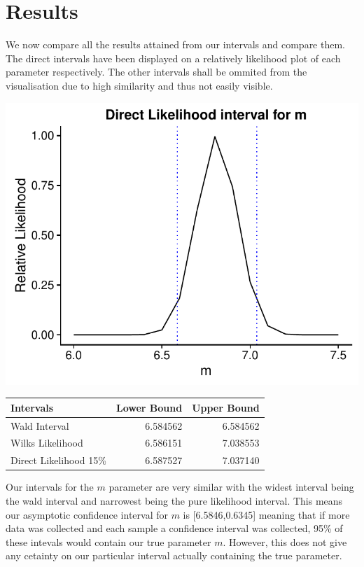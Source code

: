 \documentclass[11pt,preprint, authoryear]{elsarticle}
\let\origtable\table
\let\endorigtable\endtable
\renewenvironment{table}[1][2] {
    \expandafter\origtable\expandafter[H]
} {
    \endorigtable
}
\numberwithin{equation}{section}
\numberwithin{figure}{section}
\numberwithin{table}{section}
\begin{document}
\section{Results}\label{results}

We now compare all the results attained from our intervals and compare
them. The direct intervals have been displayed on a relatively
likelihood plot of each parameter respectively. The other intervals
shall be ommited from the visualisation due to high similarity and thus
not easily visible.

\includegraphics{likelihood_files/figure-latex/unnamed-chunk-10-1.pdf}

\begin{table}

\caption{\label{tab:intervals}Intervals for m parameter}
\centering
\begin{tabular}[t]{lrr}
\toprule
Intervals & Lower Bound & Upper Bound\\
\midrule
Wald Interval & 6.584562 & 6.584562\\
Wilks Likelihood & 6.586151 & 7.038553\\
Direct Likelihood 15\% & 6.587527 & 7.037140\\
\bottomrule
\end{tabular}
\end{table}

Our intervals for the \(m\) parameter are very similar with the widest
interval being the wald interval and narrowest being the pure likelihood
interval. This means our asymptotic confidence interval for \(m\) is
{[}6.5846,0.6345{]} meaning that if more data was collected and each
sample a confidence interval was collected, 95\% of these intevals would
contain our true parameter \(m\). However, this does not give any
cetainty on our particular interval actually containing the true
parameter.
\end{document}
